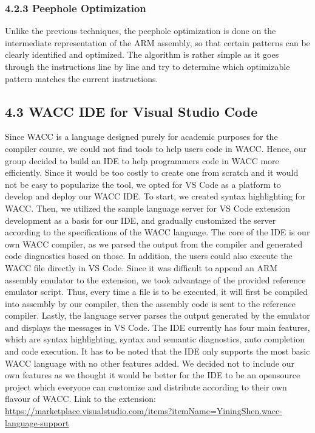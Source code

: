 \documentclass[10pt,a4paper]{report}
\begin{document}
  \subsubsection*{4.2.3	Peephole Optimization}
  Unlike the previous techniques, the peephole optimization is done on the intermediate representation of the ARM assembly, so that certain patterns
  can be clearly identified and optimized. The algorithm is rather simple as it goes through the instructions line by line and try to determine which 
  optimizable pattern matches the current instructions.

  \subsection*{4.3 WACC IDE for Visual Studio Code}
  Since WACC is a language designed purely for academic purposes for the compiler course, we could not find tools to help users code in WACC. Hence, 
  our group decided to build an IDE to help programmers code in WACC more efficiently. Since it would be too costly to create one from scratch and 
  it would not be easy to popularize the tool, we opted for VS Code as a platform to develop and deploy our WACC IDE. To start, we created syntax 
  highlighting for WACC. Then, we utilized the sample language server for VS Code extension development as a basis for our IDE, and gradually customized 
  the server according to the specifications of the WACC language. The core of the IDE is our own WACC compiler, as we parsed the output from the compiler 
  and generated code diagnostics based on those. In addition, the users could also execute the WACC file directly in VS Code. Since it was difficult to 
  append an ARM assembly emulator to the extension, we took advantage of the provided reference emulator script. Thus, every time a file is to be executed, 
  it will first be compiled into assembly by our compiler, then the assembly code is sent to the reference compiler. Lastly, the language server parses the 
  output generated by the emulator and displays the messages in VS Code. The IDE currently has four main features, which are syntax highlighting, syntax 
  and semantic diagnostics, auto completion and code execution. It has to be noted that the IDE only supports the most basic WACC language with no other 
  features added. We decided not to include our own features as we thought it would be better for the IDE to be an opensource project which everyone can 
  customize and distribute according to their own flavour of WACC. Link to the extension: 
  \url{https://marketplace.visualstudio.com/items?itemName=YiningShen.wacc-language-support}
\end{document}
